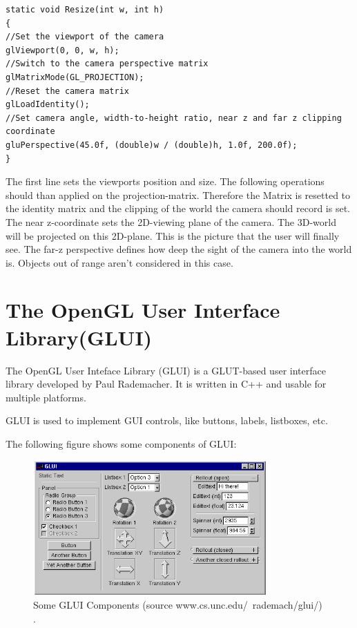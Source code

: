 \documentclass[10pt,a4paper,DIV=11]{scrreprt}
\begin{document}
\begin{lstlisting}[caption={Resize camera perspective on window resize},label=lst:glut-resize]
static void Resize(int w, int h)
{
//Set the viewport of the camera
glViewport(0, 0, w, h);
//Switch to the camera perspective matrix
glMatrixMode(GL_PROJECTION); 
//Reset the camera matrix
glLoadIdentity();
//Set camera angle, width-to-height ratio, near z and far z clipping coordinate
gluPerspective(45.0f, (double)w / (double)h, 1.0f, 200.0f);
}
\end{lstlisting}

The first line sets the viewports position and size. The following operations should than applied on the projection-matrix. Therefore the Matrix is resetted to the identity matrix and the clipping of the world the camera should record is set. The near z-coordinate sets the 2D-viewing plane of the camera. The 3D-world will be projected on this 2D-plane. This is the picture that the user will finally see. The far-z perspective defines how deep the sight of the camera into the world is. Objects out of range aren't considered in this case. \\

\section{The OpenGL User Interface Library(GLUI)}
The OpenGL User Inteface Library (GLUI) is a GLUT-based user interface library developed by Paul Rademacher. It is written in C++ and usable for multiple platforms.

GLUI is used to implement GUI controls, like buttons, labels, listboxes, etc.

The following figure shows some components of GLUI:

\begin{center}
	\begin{figure}[H]
		\centering
		\includegraphics[width=0.8\textwidth,scale=1.0]{files/glui.png}  
		\caption{Some GLUI Components (source www.cs.unc.edu/~rademach/glui/) \cite{ogl-glui}.}
		\label{fig:ogl-glui}
	\end{figure}
\end{center}
\end{document}
